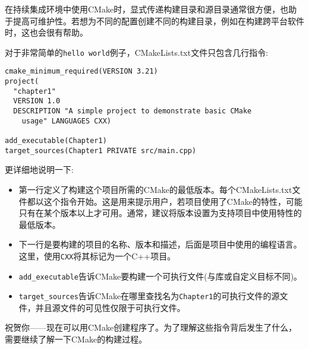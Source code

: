 在持续集成环境中使用CMake时，显式传递构建目录和源目录通常很方便，也助于提高可维护性。若想为不同的配置创建不同的构建目录，例如在构建跨平台软件时，这也会很有帮助。


对于非常简单的\texttt{hello world}例子，CMakeLists.txt文件只包含几行指令:

\begin{lstlisting}[style=styleCMake]
cmake_minimum_required(VERSION 3.21)
project(
  "chapter1"
  VERSION 1.0
  DESCRIPTION "A simple project to demonstrate basic CMake
    usage" LANGUAGES CXX)

add_executable(Chapter1)
target_sources(Chapter1 PRIVATE src/main.cpp)
\end{lstlisting}

更详细地说明一下:

\begin{itemize}
\item 
第一行定义了构建这个项目所需的CMake的最低版本。每个CMakeLists.txt文件都以这个指令开始。这是用来提示用户，若项目使用了CMake的特性，可能只有在某个版本以上才可用。通常，建议将版本设置为支持项目中使用特性的最低版本。

\item 
下一行是要构建的项目的名称、版本和描述，后面是项目中使用的编程语言。这里，使用\texttt{CXX}将其标记为一个C++项目。

\item 
\texttt{add\_executable}告诉CMake要构建一个可执行文件(与库或自定义目标不同)。

\item 
\texttt{target\_sources}告诉CMake在哪里查找名为\texttt{Chapter1}的可执行文件的源文件，并且源文件的可见性仅限于可执行文件。
\end{itemize}

祝贺你——现在可以用CMake创建程序了。为了理解这些指令背后发生了什么，需要继续了解一下CMake的构建过程。































